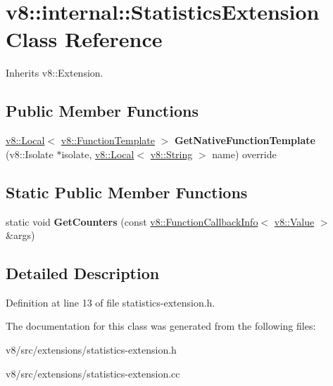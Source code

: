 \hypertarget{classv8_1_1internal_1_1StatisticsExtension}{}\section{v8\+:\+:internal\+:\+:Statistics\+Extension Class Reference}
\label{classv8_1_1internal_1_1StatisticsExtension}


Inherits v8\+::\+Extension.

\subsection*{Public Member Functions}
\begin{DoxyCompactItemize}
\item 
\mbox{\label{classv8_1_1internal_1_1StatisticsExtension_a6f07ef4e1a6d10ec26988e68c23e1d5b}} 
\mbox{\hyperlink{classv8_1_1Local}{v8\+::\+Local}}$<$ \mbox{\hyperlink{classv8_1_1FunctionTemplate}{v8\+::\+Function\+Template}} $>$ {\bfseries Get\+Native\+Function\+Template} (v8\+::\+Isolate $\ast$isolate, \mbox{\hyperlink{classv8_1_1Local}{v8\+::\+Local}}$<$ \mbox{\hyperlink{classv8_1_1String}{v8\+::\+String}} $>$ name) override
\end{DoxyCompactItemize}
\subsection*{Static Public Member Functions}
\begin{DoxyCompactItemize}
\item 
\mbox{\label{classv8_1_1internal_1_1StatisticsExtension_a5c931db2a7a9ec0e587f5884f1cde09f}} 
static void {\bfseries Get\+Counters} (const \mbox{\hyperlink{classv8_1_1FunctionCallbackInfo}{v8\+::\+Function\+Callback\+Info}}$<$ \mbox{\hyperlink{classv8_1_1Value}{v8\+::\+Value}} $>$ \&args)
\end{DoxyCompactItemize}


\subsection{Detailed Description}


Definition at line 13 of file statistics-\/extension.\+h.



The documentation for this class was generated from the following files\+:\begin{DoxyCompactItemize}
\item 
v8/src/extensions/statistics-\/extension.\+h\item 
v8/src/extensions/statistics-\/extension.\+cc\end{DoxyCompactItemize}
